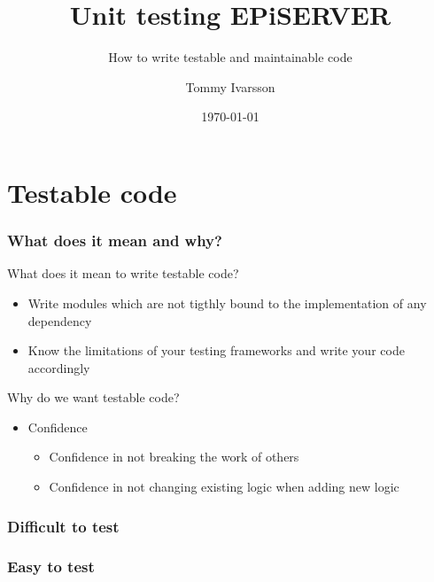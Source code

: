\documentclass{beamer}
\title{Unit testing EPiSERVER}
\subtitle{How to write testable and maintainable code}
\author{Tommy Ivarsson}
\date{\today}
\begin{document}
	\setcounter{showProgressBar}{0}
	\setcounter{showSlideNumbers}{0}

	\frame{\titlepage}

	\setcounter{framenumber}{0}
	\setcounter{showProgressBar}{1}
	\setcounter{showSlideNumbers}{1}
	\section{Testable code}
		\begin{frame}
			\frametitle{What does it mean and why?} \pause
			\begin{exampleblock}{What does it mean to write testable code?} \pause
				\begin{itemize}
					\item Write modules which are not tigthly bound to the implementation of any dependency \pause
					\item Know the limitations of your testing frameworks and write your code accordingly \pause
				\end{itemize}
			\end{exampleblock}
			\begin{exampleblock}{Why do we want testable code?} \pause
				\begin{itemize}
					\item Confidence \pause
					\begin{itemize}
						\item Confidence in not breaking the work of others \pause
						\item Confidence in not changing existing logic when adding new logic
					\end{itemize}
				\end{itemize}
			\end{exampleblock}
		\end{frame}
		\begin{frame}
			\frametitle{Difficult to test}
			
		\end{frame}
		\begin{frame}
			\frametitle{Easy to test}
			
		\end{frame}
\end{document}
